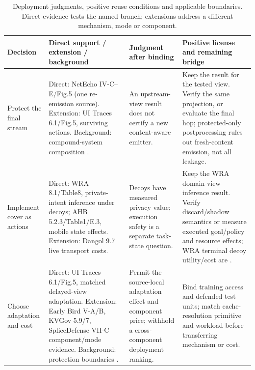 \begin{table}[t]\centering\footnotesize
\caption{Deployment judgments, positive reuse conditions and applicable boundaries. Direct evidence tests the named branch; extensions address a different mechanism, mode or component.}\label{tab:synthesis-decisions}
\begin{tabularx}{\textwidth}{@{}p{}p{}YY@{}}\toprule
Decision & Direct support / extension / background & Judgment after binding & Positive license and remaining bridge\\\midrule
Protect the final stream & Direct: NetEcho IV-C--E/Fig.5 (one re-emission source). Extension: UI Traces 6.1/Fig.5, surviving actions. Background: compound-system composition \cite{banerjee2024compound}. & An upstream-view result does not certify a new content-aware emitter. & Keep the result for the tested view. Verify the same projection, or evaluate the final hop; protected-only postprocessing rules out fresh-content emission, not all leakage.\\
Implement cover as actions & Direct: WRA 8.1/Table8, private-intent inference under decoys; AHB 5.2.3/Table1/E.3, mobile state effects. Extension: Dangol 9.7 live transport costs. & Decoys have measured privacy value; execution safety is a separate task-state question. & Keep the WRA domain-view inference result. Verify discard/shadow semantics or measure executed goal/policy and resource effects; WRA terminal decoy utility/cost are \NRR{}.\\
Choose adaptation and cost & Direct: UI Traces 6.1/Fig.5, matched delayed-view adaptation. Extension: Early Bird V-A/B, KVGov 5.9/7, SpliceDefense VII-C component/mode evidence. Background: protection boundaries \cite{forough2026secrets}. & Permit the source-local adaptation effect and component price; withhold a cross-component deployment ranking. & Bind training access and defended test units; match cache-resolution primitive and workload before transferring mechanism or cost.\\\bottomrule
\end{tabularx}\end{table}
